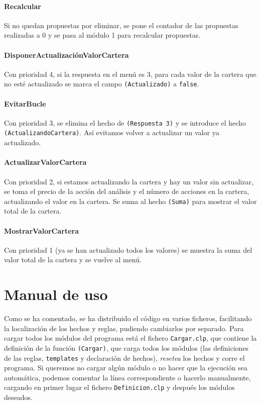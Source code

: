 \documentclass[11pt,leqno]{article}
\theoremstyle{definition_wo_parentheses}
\theoremstyle{plain}
\theoremstyle{remark}
\begin{document}
\paragraph{Recalcular} Si no quedan propuestas por eliminar, se pone el contador de las propuestas realizadas a 0 y se pasa al módulo 1 para recalcular propuestas.

\paragraph{DisponerActualizaciónValorCartera} Con prioridad 4, si la respuesta en el menú es 3, para cada valor de la cartera que no esté actualizado se marca el campo \texttt{(Actualizado)} a \texttt{false}.

\paragraph{EvitarBucle} Con prioridad 3, se elimina el hecho de \texttt{(Respuesta 3)} y se introduce el hecho \texttt{(ActualizandoCartera)}. Así evitamos volver a actualizar un valor ya actualizado.

\paragraph{ActualizarValorCartera} Con prioridad 2, si estamos actualizando la cartera y hay un valor sin actualizar, se toma el precio de la acción del análisis y el número de acciones en la cartera, actualizando el valor en la cartera. Se suma al hecho \texttt{(Suma)} para mostrar el valor total de la cartera.

\paragraph{MostrarValorCartera} Con prioridad 1 (ya se han actualizado todos los valores) se muestra la suma del valor total de la cartera y se vuelve al menú.

\section{Manual de uso}

Como se ha comentado, se ha distribuido el código en varios ficheros, facilitando la localización de los hechos y reglas, pudiendo cambiarlos por separado. Para cargar todos los módulos del programa está el fichero \texttt{Cargar.clp}, que contiene la definición de la función \texttt{(Cargar)}, que carga todos los módulos (las definiciones de las reglas, \texttt{templates} y declaración de hechos), \textit{resetea} los hechos y corre el programa. Si queremos no cargar algún módulo o no hacer que la ejecución sea automática, podemos comentar la línea correspondiente o hacerlo manualmente, cargando en primer lugar el fichero \texttt{Definicion.clp} y después los módulos deseados.\\
\end{document}
